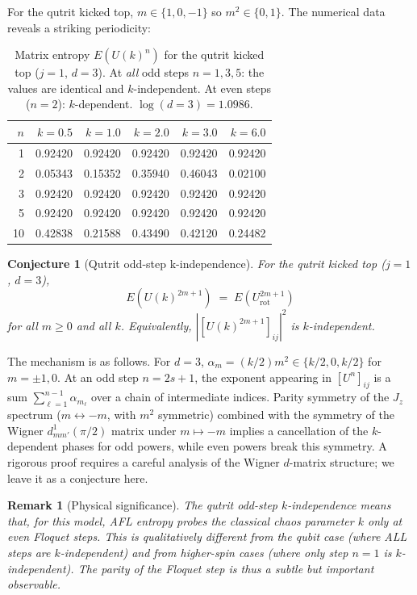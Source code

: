 \documentclass[12pt,a4paper]{article}
\newtheorem{remark}[theorem]{Remark}
\newtheorem{conjecture}[theorem]{Conjecture}
\begin{document}
For the qutrit kicked top, $m \in \{1, 0, -1\}$ so $m^2 \in \{0,1\}$.
The numerical data reveals a striking periodicity:

\begin{table}[h]\centering
\begin{tabular}{r|rrrrr}
\hline
$n$ & $k=0.5$ & $k=1.0$ & $k=2.0$ & $k=3.0$ & $k=6.0$ \\
\hline
1  & 0.92420 & 0.92420 & 0.92420 & 0.92420 & 0.92420 \\
2  & 0.05343 & 0.15352 & 0.35940 & 0.46043 & 0.02100 \\
3  & 0.92420 & 0.92420 & 0.92420 & 0.92420 & 0.92420 \\
5  & 0.92420 & 0.92420 & 0.92420 & 0.92420 & 0.92420 \\
10 & 0.42838 & 0.21588 & 0.43490 & 0.42120 & 0.24482 \\
\hline
\end{tabular}
\caption{Matrix entropy $E(U(k)^n)$ for the qutrit kicked top ($j=1$, $d=3$).
At \emph{all} odd steps $n=1,3,5$: the values are identical and $k$-independent.
At even steps ($n=2$): $k$-dependent.  $\log(d=3) = 1.0986$.}
\label{tab:E_qutrit}
\end{table}

\begin{conjecture}[Qutrit odd-step k-independence]\label{conj:qutrit_odd}
For the qutrit kicked top ($j=1$, $d=3$),
\[
  E(U(k)^{2m+1}) \;=\; E(U_{\mathrm{rot}}^{2m+1})
\]
for all $m\geq 0$ and all $k$.  Equivalently, $|[U(k)^{2m+1}]_{ij}|^2$
is $k$-independent.
\end{conjecture}

The mechanism is as follows.  For $d=3$, $\alpha_m = (k/2)m^2 \in \{k/2, 0, k/2\}$
for $m=\pm 1, 0$.  At an odd step $n=2s+1$, the exponent appearing in $[U^n]_{ij}$
is a sum $\sum_{\ell=1}^{n-1}\alpha_{m_\ell}$ over a chain of intermediate indices.
Parity symmetry of the $J_z$ spectrum ($m \leftrightarrow -m$, with $m^2$ symmetric)
combined with the symmetry of the Wigner $d^1_{mm'}(\pi/2)$ matrix under
$m\mapsto -m$ implies a cancellation of the $k$-dependent phases for odd powers,
while even powers break this symmetry.  A rigorous proof requires a careful analysis
of the Wigner $d$-matrix structure; we leave it as a conjecture here.

\begin{remark}[Physical significance]
The qutrit odd-step $k$-independence means that, for this model, AFL entropy probes
the classical chaos parameter $k$ \emph{only} at even Floquet steps.  This
is qualitatively different from the qubit case (where ALL steps are $k$-independent)
and from higher-spin cases (where only step $n=1$ is $k$-independent).  The parity
of the Floquet step is thus a subtle but important observable.
\end{remark}
\end{document}
